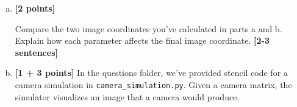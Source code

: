 \begin{enumerate}[(a)]
\begin{enumerate} [(i)]
\begin{tcolorbox}[colback=white!5!white,colframe=green!75!black]
{{    %
    }}
\end{tcolorbox}

\end{enumerate}
\item \textbf{[2 points]}

\begin{tcolorbox}[colback=orange!5!white,colframe=orange!75!black]
Compare the two image coordinates you've calculated in parts a and b. Explain how each parameter affects the final image coordinate. \textbf{[2-3 sentences]}
\end{tcolorbox}











\item \textbf{[1 + 3 points]}
In the questions folder, we've provided stencil code for a camera simulation in \texttt{camera\_simulation.py}. Given a camera matrix, the simulator visualizes an image that a camera would produce. 


\end{enumerate}

